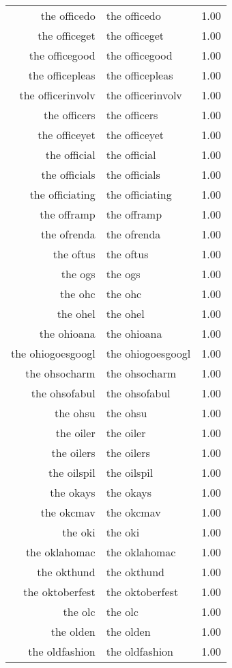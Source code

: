 \begin{table}[ht]
\begin{tabular}{rlr}
  the officedo & the officedo & 1.00 \\ 
  the officeget & the officeget & 1.00 \\ 
  the officegood & the officegood & 1.00 \\ 
  the officepleas & the officepleas & 1.00 \\ 
  the officerinvolv & the officerinvolv & 1.00 \\ 
  the officers & the officers & 1.00 \\ 
  the officeyet & the officeyet & 1.00 \\ 
  the official & the official & 1.00 \\ 
  the officials & the officials & 1.00 \\ 
  the officiating & the officiating & 1.00 \\ 
  the offramp & the offramp & 1.00 \\ 
  the ofrenda & the ofrenda & 1.00 \\ 
  the oftus & the oftus & 1.00 \\ 
  the ogs & the ogs & 1.00 \\ 
  the ohc & the ohc & 1.00 \\ 
  the ohel & the ohel & 1.00 \\ 
  the ohioana & the ohioana & 1.00 \\ 
  the ohiogoesgoogl & the ohiogoesgoogl & 1.00 \\ 
  the ohsocharm & the ohsocharm & 1.00 \\ 
  the ohsofabul & the ohsofabul & 1.00 \\ 
  the ohsu & the ohsu & 1.00 \\ 
  the oiler & the oiler & 1.00 \\ 
  the oilers & the oilers & 1.00 \\ 
  the oilspil & the oilspil & 1.00 \\ 
  the okays & the okays & 1.00 \\ 
  the okcmav & the okcmav & 1.00 \\ 
  the oki & the oki & 1.00 \\ 
  the oklahomac & the oklahomac & 1.00 \\ 
  the okthund & the okthund & 1.00 \\ 
  the oktoberfest & the oktoberfest & 1.00 \\ 
  the olc & the olc & 1.00 \\ 
  the olden & the olden & 1.00 \\ 
  the oldfashion & the oldfashion & 1.00 \\ 

\end{tabular}
\end{table}

